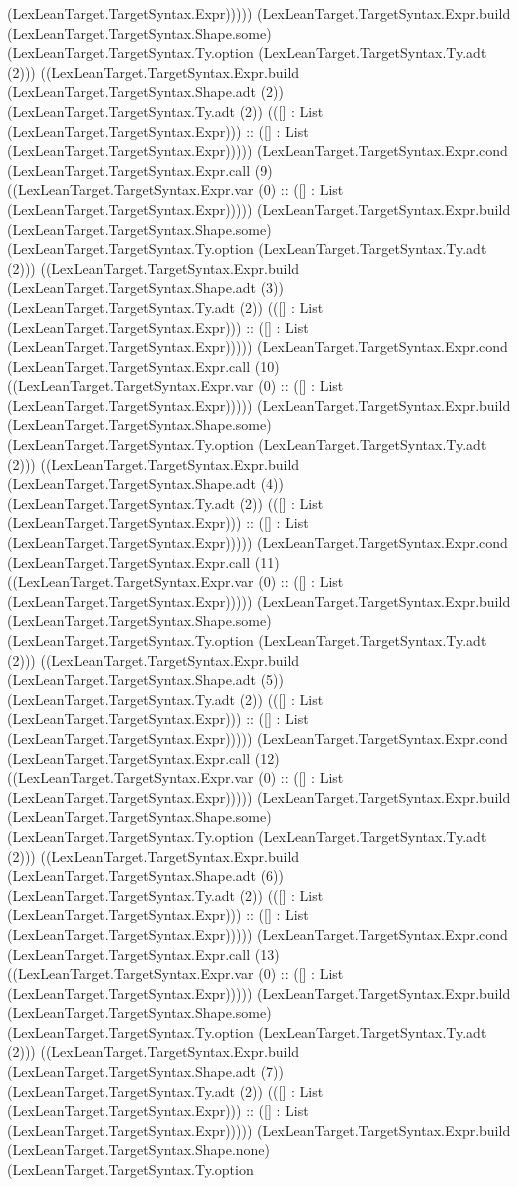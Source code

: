 \documentclass[11pt]{article}
\begin{document}
(LexLeanTarget.TargetSyntax.Expr))))) (LexLeanTarget.TargetSyntax.Expr.build (LexLeanTarget.TargetSyntax.Shape.some) (LexLeanTarget.TargetSyntax.Ty.option (LexLeanTarget.TargetSyntax.Ty.adt (2))) ((LexLeanTarget.TargetSyntax.Expr.build (LexLeanTarget.TargetSyntax.Shape.adt (2)) (LexLeanTarget.TargetSyntax.Ty.adt (2)) (([] : List (LexLeanTarget.TargetSyntax.Expr))) :: ([] : List (LexLeanTarget.TargetSyntax.Expr))))) (LexLeanTarget.TargetSyntax.Expr.cond (LexLeanTarget.TargetSyntax.Expr.call (9) ((LexLeanTarget.TargetSyntax.Expr.var (0) :: ([] : List (LexLeanTarget.TargetSyntax.Expr))))) (LexLeanTarget.TargetSyntax.Expr.build (LexLeanTarget.TargetSyntax.Shape.some) (LexLeanTarget.TargetSyntax.Ty.option (LexLeanTarget.TargetSyntax.Ty.adt (2))) ((LexLeanTarget.TargetSyntax.Expr.build (LexLeanTarget.TargetSyntax.Shape.adt (3)) (LexLeanTarget.TargetSyntax.Ty.adt (2)) (([] : List (LexLeanTarget.TargetSyntax.Expr))) :: ([] : List (LexLeanTarget.TargetSyntax.Expr))))) (LexLeanTarget.TargetSyntax.Expr.cond (LexLeanTarget.TargetSyntax.Expr.call (10) ((LexLeanTarget.TargetSyntax.Expr.var (0) :: ([] : List (LexLeanTarget.TargetSyntax.Expr))))) (LexLeanTarget.TargetSyntax.Expr.build (LexLeanTarget.TargetSyntax.Shape.some) (LexLeanTarget.TargetSyntax.Ty.option (LexLeanTarget.TargetSyntax.Ty.adt (2))) ((LexLeanTarget.TargetSyntax.Expr.build (LexLeanTarget.TargetSyntax.Shape.adt (4)) (LexLeanTarget.TargetSyntax.Ty.adt (2)) (([] : List (LexLeanTarget.TargetSyntax.Expr))) :: ([] : List (LexLeanTarget.TargetSyntax.Expr))))) (LexLeanTarget.TargetSyntax.Expr.cond (LexLeanTarget.TargetSyntax.Expr.call (11) ((LexLeanTarget.TargetSyntax.Expr.var (0) :: ([] : List (LexLeanTarget.TargetSyntax.Expr))))) (LexLeanTarget.TargetSyntax.Expr.build (LexLeanTarget.TargetSyntax.Shape.some) (LexLeanTarget.TargetSyntax.Ty.option (LexLeanTarget.TargetSyntax.Ty.adt (2))) ((LexLeanTarget.TargetSyntax.Expr.build (LexLeanTarget.TargetSyntax.Shape.adt (5)) (LexLeanTarget.TargetSyntax.Ty.adt (2)) (([] : List (LexLeanTarget.TargetSyntax.Expr))) :: ([] : List (LexLeanTarget.TargetSyntax.Expr))))) (LexLeanTarget.TargetSyntax.Expr.cond (LexLeanTarget.TargetSyntax.Expr.call (12) ((LexLeanTarget.TargetSyntax.Expr.var (0) :: ([] : List (LexLeanTarget.TargetSyntax.Expr))))) (LexLeanTarget.TargetSyntax.Expr.build (LexLeanTarget.TargetSyntax.Shape.some) (LexLeanTarget.TargetSyntax.Ty.option (LexLeanTarget.TargetSyntax.Ty.adt (2))) ((LexLeanTarget.TargetSyntax.Expr.build (LexLeanTarget.TargetSyntax.Shape.adt (6)) (LexLeanTarget.TargetSyntax.Ty.adt (2)) (([] : List (LexLeanTarget.TargetSyntax.Expr))) :: ([] : List (LexLeanTarget.TargetSyntax.Expr))))) (LexLeanTarget.TargetSyntax.Expr.cond (LexLeanTarget.TargetSyntax.Expr.call (13) ((LexLeanTarget.TargetSyntax.Expr.var (0) :: ([] : List (LexLeanTarget.TargetSyntax.Expr))))) (LexLeanTarget.TargetSyntax.Expr.build (LexLeanTarget.TargetSyntax.Shape.some) (LexLeanTarget.TargetSyntax.Ty.option (LexLeanTarget.TargetSyntax.Ty.adt (2))) ((LexLeanTarget.TargetSyntax.Expr.build (LexLeanTarget.TargetSyntax.Shape.adt (7)) (LexLeanTarget.TargetSyntax.Ty.adt (2)) (([] : List (LexLeanTarget.TargetSyntax.Expr))) :: ([] : List (LexLeanTarget.TargetSyntax.Expr))))) (LexLeanTarget.TargetSyntax.Expr.build (LexLeanTarget.TargetSyntax.Shape.none) (LexLeanTarget.TargetSyntax.Ty.option 
\end{document}
